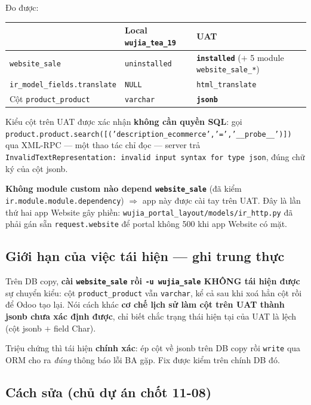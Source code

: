 Đo được:

\begin{center}
\begin{tabular}{lll}
\hline
& Local \texttt{wujia\_tea\_19} & UAT \\
\hline
\texttt{website\_sale} & \texttt{uninstalled} & \textbf{\texttt{installed}} ($+$ 5 module
  \texttt{website\_sale\_*}) \\
\texttt{ir\_model\_fields.translate} & \texttt{NULL} & \texttt{html\_translate} \\
Cột \texttt{product\_product} & \texttt{varchar} & \textbf{\texttt{jsonb}} \\
\hline
\end{tabular}
\end{center}

Kiểu cột trên UAT được xác nhận \textbf{không cần quyền SQL}: gọi
\texttt{product.product.search([('description\_ecommerce','=','\_\_probe\_\_')])} qua XML-RPC ---
một thao tác chỉ đọc --- server trả \texttt{InvalidTextRepresentation: invalid input syntax for
type json}, đúng chữ ký của cột jsonb.

\textbf{Không module custom nào depend \texttt{website\_sale}} (đã kiểm
\texttt{ir.module.module.dependency}) $\Rightarrow$ app này được cài tay trên UAT. Đây là lần thứ
hai app Website gây phiền: \texttt{wujia\_portal\_layout/models/ir\_http.py} đã phải gán sẵn
\texttt{request.website} để portal không 500 khi app Website có mặt.

\subsection{Giới hạn của việc tái hiện --- ghi trung thực}

Trên DB copy, \textbf{cài \texttt{website\_sale} rồi \texttt{-u wujia\_sale} KHÔNG tái hiện
được} sự chuyển kiểu: cột \texttt{product\_product} vẫn \texttt{varchar}, kể cả sau khi xoá hẳn
cột rồi để Odoo tạo lại. Nói cách khác \textbf{cơ chế lịch sử làm cột trên UAT thành jsonb chưa
xác định được}, chỉ biết chắc trạng thái hiện tại của UAT là lệch (cột jsonb $+$ field Char).

Triệu chứng thì tái hiện \textbf{chính xác}: ép cột về jsonb trên DB copy rồi \texttt{write} qua
ORM cho ra \emph{đúng} thông báo lỗi BA gặp. Fix được kiểm trên chính DB đó.

\subsection{Cách sửa (chủ dự án chốt 11-08)}

